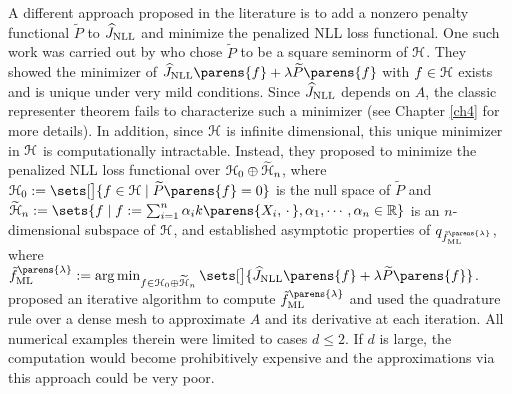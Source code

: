A different approach proposed in the literature is to add a nonzero penalty functional $\widetilde{P}$ to $\widehat{J}_{\mathrm{NLL}}$ and minimize the penalized NLL loss functional. One such work was carried out by \textcite{Gu1993-na} who chose $\widetilde{P}$ to be a square seminorm of $\mathcal{H}$. They showed the minimizer of $\widehat{J}_{\NLL} \parens{f} + \lambda \widetilde{P} \parens{f}$ with $f \in \mathcal{H}$ exists and is unique under very mild conditions. 
Since $\widehat{J}_{\mathrm{NLL}}$ depends on $A$, the classic representer theorem fails to characterize such a minimizer (see Chapter \ref{ch4} for more details). In addition, since $\mathcal{H}$ is infinite dimensional, this unique minimizer in $\mathcal{H}$ is computationally intractable. Instead, they proposed to minimize the penalized NLL loss functional over $\mathcal{H}_{0} \oplus \widetilde{\mathcal{H}}_n$, where $\calH_0 := \sets[\big]{f \in \calH \mid \widetilde{P} \parens{f} = 0}$ is the null space of $\widetilde{P}$ and $\widetilde{\calH}_n := \sets{f \mid f := \sum_{i=1}^n \alpha_i k \parens{X_i, \,\cdot\,}, \alpha_1, \cdots, \alpha_n \in \Real}$ is an $n$-dimensional subspace of $\mathcal{H}$, and established asymptotic properties of $q_{\tilde{f}_{\ML}^{\parens{\lambda}}}$, where $\tilde{f}_{\ML}^{\parens{\lambda}} := \argmin_{f \in \calH_{0} \oplus \widetilde{\calH}_n} \sets[\big]{\widehat{J}_{\NLL} \parens{f} + \lambda \widetilde{P} \parens{f}}$. 
\textcite{Gu1993-lf} proposed an iterative algorithm to compute $\tilde{f}_{\ML}^{\parens{\lambda}}$ and used the quadrature rule over a dense mesh to approximate $A$ and its derivative at each iteration. All numerical examples therein were limited to cases $d \le 2$. If $d$ is large, the computation would become prohibitively expensive and the approximations via this approach could be very poor. 

